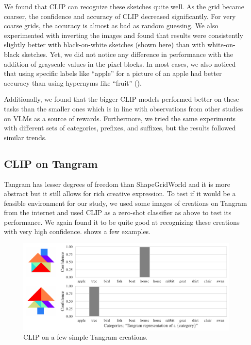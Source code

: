 We found that CLIP can recognize these sketches quite well.
As the grid became coarser, the confidence and accuracy of CLIP decreased significantly.
For very coarse grids, the accuracy is almost as bad as random guessing.
We also experimented with inverting the images and found that results were consistently slightly better with black-on-white sketches (shown here) than with white-on-black sketches.
Yet, we did not notice any difference in performance with the addition of grayscale values in the pixel blocks.
In most cases, we also noticed that using specific labels like ``apple'' for a picture of an apple had better accuracy than using hypernyms like ``fruit'' ().

Additionally, we found that the bigger CLIP models performed better on these tasks than the smaller ones which is in line with observations from other studies on VLMs as a source of rewards.
Furthermore, we tried the same experiments with different sets of categories, prefixes, and suffixes, but the results followed similar trends.


\subsection{CLIP on Tangram}
\label{sec:clip-tangram}

Tangram has lesser degrees of freedom than ShapeGridWorld and it is more abstract but it still allows for rich creative expression.
To test if it would be a feasible environment for our study, we used some images of creations on Tangram from the internet and used CLIP as a zero-shot classifier as above to test its performance.
We again found it to be quite good at recognizing these creations with very high confidence.
 shows a few examples.
\begin{figure}[h]
    \centering
    \includegraphics[width=\textwidth]{images/tangram_comparison_10.pdf}
    \caption{CLIP on a few simple Tangram creations.}
    \label{fig:clip-tangram}
\end{figure}

